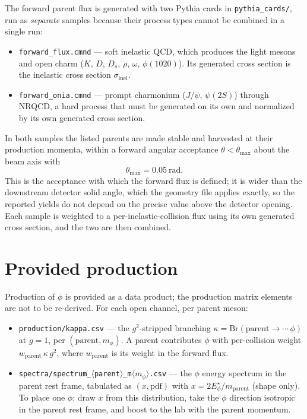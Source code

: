 \documentclass[11pt]{article}
\begin{document}
The forward parent flux is generated with two Pythia cards in
\texttt{pythia\_cards/}, run as \emph{separate} samples because their process
types cannot be combined in a single run:
\begin{itemize}
\item \texttt{forward\_flux.cmnd} --- soft inelastic QCD, which produces the
  light mesons and open charm ($K$, $D$, $D_s$, $\rho$, $\omega$, $\phi(1020)$).
  Its generated cross section is the inelastic cross section
  $\sigma_{\mathrm{inel}}$.
\item \texttt{forward\_onia.cmnd} --- prompt charmonium ($J/\psi$, $\psi(2S)$)
  through NRQCD, a hard process that must be generated on its own and normalized
  by its own generated cross section.
\end{itemize}
In both samples the listed parents are made stable and harvested at their
production momenta, within a forward angular acceptance $\theta < \theta_{\max}$
about the beam axis with
\[
\theta_{\max} = 0.05~\mathrm{rad}.
\]
This is the acceptance with which the forward flux is defined; it is wider than
the downstream detector solid angle, which the geometry file applies exactly, so
the reported yields do not depend on the precise value above the detector
opening. Each sample is weighted to a per-inelastic-collision flux using its own
generated cross section, and the two are then combined.

\section*{Provided production}

Production of $\phi$ is provided as a data product; the production matrix
elements are not to be re-derived. For each open channel, per parent meson:
\begin{itemize}
\item \texttt{production/kappa.csv} --- the $g^2$-stripped branching
  $\kappa = \mathrm{Br}(\text{parent}\to\cdots\,\phi)$ at $g=1$, per
  $(\text{parent}, m_\phi)$. A parent contributes $\phi$ with per-collision
  weight $w_{\text{parent}}\,\kappa\,g^2$, where $w_{\text{parent}}$ is its
  weight in the forward flux.
\item \texttt{spectra/spectrum\_$\langle$parent$\rangle$\_m$\langle m_\phi\rangle$.csv}
  --- the $\phi$ energy spectrum in the parent rest frame, tabulated as
  $(x, \mathrm{pdf})$ with $x = 2E_\phi^\star/m_{\text{parent}}$ (shape only).
  To place one $\phi$: draw $x$ from this distribution, take the $\phi$
  direction isotropic in the parent rest frame, and boost to the lab with the
  parent momentum.
\end{itemize}
\end{document}

